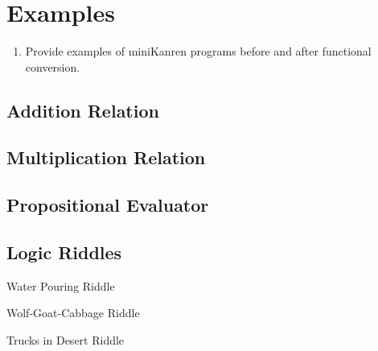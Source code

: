 \section{Examples}

\begin{enumerate}
    \item Provide examples of miniKanren programs before and after functional conversion.
\end{enumerate}


\subsection{Addition Relation}

\subsection{Multiplication Relation}

\subsection{Propositional Evaluator}

\subsection{Logic Riddles}

Water Pouring Riddle

Wolf-Goat-Cabbage Riddle

Trucks in Desert Riddle